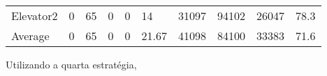 \documentclass[a4paper]{article}
\begin{document}
\begin{table}[h]
\begin{tabular}{@{}llllllllll@{}}
Elevator2 & 0        & 65            & 0           & 0                                                               & 14                                                                  & 31097                                                         & 94102                                                 & 26047                                                   & 78.3         \\
Average   & 0     & 65         & 0        & 0                                                               & 21.67                                                               & 41098                                                         & 84100                                                 &  33383                                                  & 71.6         \\ \bottomrule
\end{tabular}
\end{table}

Utilizando a quarta estratégia,
\end{document}
